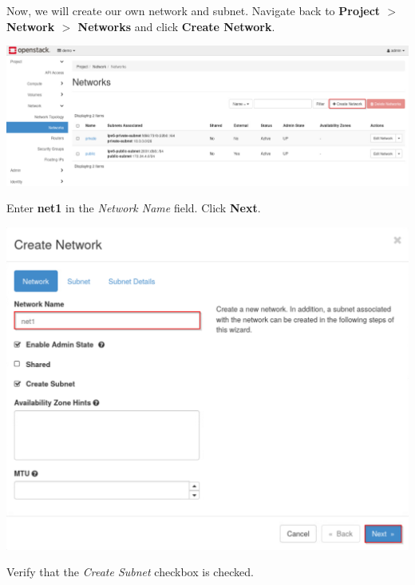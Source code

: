 \documentclass[letterpaper, 12pt]{article}
\begin{document}
\begin{enumerate}
    \begin{labstep}
        Now, we will create our own network and subnet.
        Navigate back to \textbf{Project $>$ Network $>$ Networks} and click \textbf{Create Network}.

        \begin{center}
            \includegraphics[width=\linewidth]{images/part3/step4.png}
        \end{center}
    \end{labstep}

    \begin{labstep}
        Enter \textbf{net1} in the \textit{Network Name} field.
        Click \textbf{Next}.

        \begin{center}
            \includegraphics[width=\linewidth]{images/part3/step5.png}
        \end{center}
    \end{labstep}

    \begin{stopbox}
        Verify that the \textit{Create Subnet} checkbox is checked.
    \end{stopbox}


\end{enumerate}
\end{document}
